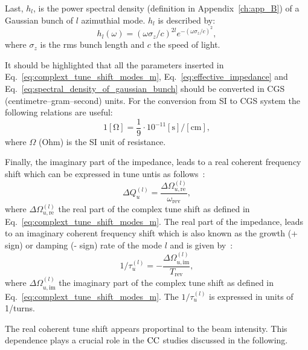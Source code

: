 Last, $h_l$, is the power spectral density (definition in Appendix~\ref{ch:app_B}) of a Gaussian bunch of $l$ azimuthial mode. $h_l$ is described by: %
\begin{equation}\label{eq:spectral_density_of_gaussian_bunch}
    h_l(\omega) = (\omega \sigma_z/c)^{2l} e^{-(\omega \sigma_z/c)^2},
\end{equation}
where $\sigma_z$ is the rms bunch length and $c$ the speed of light.

It should be highlighted that all the parameters inserted in Eq.~\eqref{eq:complext_tune_shift_modes_m},  Eq.~\eqref{eq:effective_impedance} and Eq.~\eqref{eq:spectral_density_of_gaussian_bunch} should be converted in CGS (centimetre–gram–second) units. For the conversion from SI to CGS system the following relations are useful:
\begin{equation}\label{eq:conversion_si_to_cgs}
    1 \mathrm{[\Omega]} = \frac{1}{9} \cdot 10^{-11} \mathrm{[s]/[cm]},
\end{equation}
where $\Omega$ (Ohm) is the SI unit of resistance.



Finally, the imaginary part of the impedance, leads to a real coherent frequency shift which can be expressed in tune untis as follows~\cite{PhysRevAccelBeams.23.124402}:
\begin{equation}\label{eq:real_tunu_mode_l}
    \Delta Q_u^{(l)} = \frac{\Delta \Omega_{u, \mathrm{{re}}}^{(l)}}{\omega_\mathrm{rev}},
\end{equation}
where $\Delta \Omega_{u, \mathrm{{re}}}^{(l)}$ the real part of the complex tune shift as defined in Eq.~\eqref{eq:complext_tune_shift_modes_m}.
The real part of the impedance, leads to an imaginary coherent frequency shift which is also known as the growth (+ sign) or damping (- sign) rate of the mode $l$ and is given by~\cite{PhysRevAccelBeams.23.124402}:
\begin{equation}\label{eq:imaginary_tune_mode_l}
    1/\tau_u^{(l)} = -\frac{\Delta \Omega_{u, \mathrm{{im}}}^{(l)}}{T_\mathrm{rev}},
\end{equation}
where $\Delta \Omega_{u, \mathrm{{im}}}^{(l)}$ the imaginary part of the complex tune shift as defined in Eq.~\eqref{eq:complext_tune_shift_modes_m}. The $1/\tau_u^{(l)}$ is expressed in units of 1/turns. 

The real coherent tune shift appears proportinal to the beam intensity. This dependence plays a crucial role in the ${\mathrm{CC}}$ studies discussed in the following.


